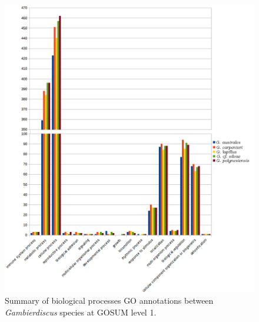 \documentclass[12pt]{article}
\begin{document}
\begin{figure} 
\includegraphics[scale=.7]{3Aug18_cluster-investigation/figures/gosum-species/Species-gosum1-bio-split.png} 
\caption{Summary of biological processes GO annotations between \textit{Gambierdiscus} species at GOSUM level 1.}%
\label{fig:SpecGo1Bio}
\end{figure} 
\end{document}
